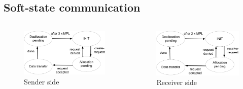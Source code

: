 \documentclass[aspectratio=169]{beamer}
\begin{document}
\subsection{Soft-state communication}
\begin{frame}
    \centering
    \begin{columns}
        \begin{column}{0.5\textwidth}
            \begin{figure}
                \includegraphics[width=\textwidth]{img/deltat-sender.png}
                Sender side
            \end{figure}
        \end{column}
        \begin{column}{0.5\textwidth}
            \begin{figure}
                \includegraphics[width=\textwidth]{img/deltat-receiver.png}
                Receiver side
            \end{figure}
        \end{column}
    \end{columns}
\end{frame}
\end{document}

